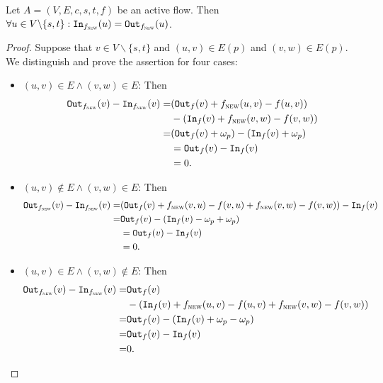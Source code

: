 \documentclass{article}
\begin{document}
\begin{lemma}
    Let $A=(V, E, c, s, t, f)$ be an active flow. Then $\forall u \in V \backslash \{s, t\} : \texttt{In}_{f_{\textsc{new}}}(u) = \texttt{Out}_{f_{\textsc{new}}}(u)$.
\end{lemma}
\begin{proof}
    Suppose that $v \in V \backslash \{s, t\}$ and $(u, v) \in E(p)$ and $(v, w) \in E(p)$. We distinguish and prove the assertion for four cases:
    \begin{itemize}
        \item $(u, v) \in E \wedge (v, w) \in E$: Then
        \begin{align*}
            \texttt{Out}_{f_{\textsc{new}}}(v) - \texttt{In}_{f_{\textsc{new}}}(v) =& (\texttt{Out}_{f}(v)+f_{\textsc{new}}(u, v) - f(u, v))\\
            &- (\texttt{In}_{f}(v)+f_{\textsc{new}}(v, w) - f(v, w))\\
            =& (\texttt{Out}_{f}(v)+\omega_p) - (\texttt{In}_{f}(v)+\omega_p)\\
            &= \texttt{Out}_{f}(v)- \texttt{In}_{f}(v)\\
            &= 0.
        \end{align*}

        \item $(u, v) \not\in E \wedge (v, w) \in E$: Then
        \begin{align*}
            \texttt{Out}_{f_{\textsc{new}}}(v) - \texttt{In}_{f_{\textsc{new}}}(v) =& (\texttt{Out}_{f}(v)+f_{\textsc{new}}(v, u) - f(v, u)+f_{\textsc{new}}(v, w) - f(v, w))
            - \texttt{In}_{f}(v)\\
            =& \texttt{Out}_{f}(v) -(\texttt{In}_{f}(v)-\omega_p+\omega_p)\\
            &= \texttt{Out}_{f}(v)- \texttt{In}_{f}(v)\\
            &= 0.
        \end{align*}

        \item $(u, v) \in E \wedge (v, w) \not\in E$: Then
        \begin{align*}
            \texttt{Out}_{f_{\textsc{new}}}(v) - \texttt{In}_{f_{\textsc{new}}}(v) =& \texttt{Out}_{f}(v)\\
            &- (\texttt{In}_{f}(v)+f_{\textsc{new}}(u, v) - f(u, v)+f_{\textsc{new}}(v, w) - f(v, w))\\
            =& \texttt{Out}_{f}(v) - (\texttt{In}_{f}(v)+\omega_p-\omega_p)\\
            =& \texttt{Out}_{f}(v)- \texttt{In}_{f}(v)\\
            =& 0.
        \end{align*}



\end{itemize}
\end{proof}
\end{document}
